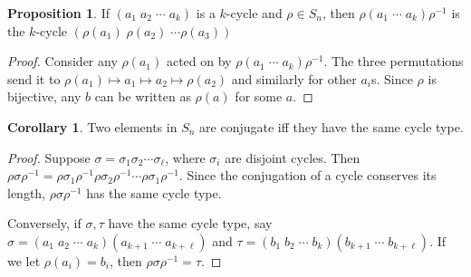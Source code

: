 \documentclass[a4paper]{article}
\theoremstyle{definition}
\newtheorem*{prop}{Proposition}
\newtheorem*{cor}{Corollary}
\begin{document}
\begin{prop}
  If $(a_1\; a_2\; \cdots \; a_k)$ is a $k$-cycle and $\rho\in S_n$, then $\rho (a_1\; \cdots\; a_k)\rho^{-1}$ is the $k$-cycle $(\rho(a_1)\; \rho(a_2)\; \cdots \rho(a_3))$
\end{prop}

\begin{proof}
  Consider any $\rho(a_1)$ acted on by $\rho (a_1\; \cdots\; a_k)\rho^{-1}$. The three permutations send it to $\rho(a_1)\mapsto a_1 \mapsto a_2 \mapsto \rho(a_2)$ and similarly for other $a_i$s. Since $\rho$ is bijective, any $b$ can be written as $\rho(a)$ for some $a$.
\end{proof}

\begin{cor}
  Two elements in $S_n$ are conjugate iff they have the same cycle type. 
\end{cor}

\begin{proof}
  Suppose $\sigma = \sigma_1\sigma_2\cdots \sigma_\ell$, where $\sigma_i$ are disjoint cycles. Then $\rho\sigma\rho^{-1} = \rho\sigma_1\rho^{-1}\rho\sigma_2\rho^{-1}\cdots \rho\sigma_1\rho^{-1}$. Since the conjugation of a cycle conserves its length, $\rho\sigma\rho^{-1}$ has the same cycle type.

Conversely, if $\sigma, \tau$ have the same cycle type, say\\$\sigma = (a_1\; a_2\;\cdots\; a_k)(a_{k + 1}\; \cdots \;a_{k + \ell})$ and $\tau = (b_1\; b_2\;\cdots\; b_k)(b_{k + 1}\; \cdots \;b_{k + \ell})$. If we let $\rho(a_i) = b_i$, then $\rho\sigma\rho^{-1} = \tau$. 
\end{proof}
\end{document}
